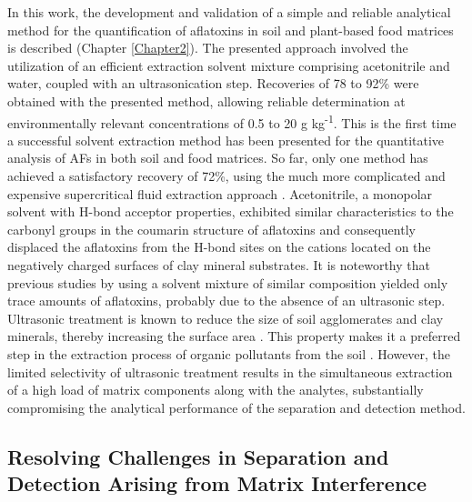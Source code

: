 In this work, the development and validation of a simple and reliable analytical method for the quantification of aflatoxins in soil and plant-based food matrices is described (Chapter \ref{Chapter2}). The presented approach involved the utilization of an efficient extraction solvent mixture comprising acetonitrile and water, coupled with an ultrasonication step. Recoveries of 78 to 92\% were obtained with the presented method, allowing reliable determination at environmentally relevant concentrations of 0.5 to 20 \textmu{}g kg\textsuperscript{-1}. This is the first time a successful solvent extraction method has been presented for the quantitative analysis of AFs in both soil and food matrices. So far, only one method has achieved a satisfactory recovery of 72\%, using the much more complicated and expensive supercritical fluid extraction approach \citep{starr2008supercritical}. Acetonitrile, a monopolar solvent with H-bond acceptor properties, exhibited similar characteristics to the carbonyl groups in the coumarin structure of aflatoxins and consequently displaced the aflatoxins from the H-bond sites on the cations located on the negatively charged surfaces of clay mineral substrates. It is noteworthy that previous studies by \citet{madden1993preliminary} using a solvent mixture of similar composition yielded only trace amounts of aflatoxins, probably due to the absence of an ultrasonic step. Ultrasonic treatment is known to reduce the size of soil agglomerates and clay minerals, thereby increasing the surface area \citep{lesueur2008comparison}. This property makes it a preferred step in the extraction process of organic pollutants from the soil \citep{bossio2008application}. However, the limited selectivity of ultrasonic treatment results in the simultaneous extraction of a high load of matrix components along with the analytes, substantially compromising the analytical performance of the separation and detection method. 

\subsection{Resolving Challenges in Separation and Detection Arising from Matrix Interference} 

